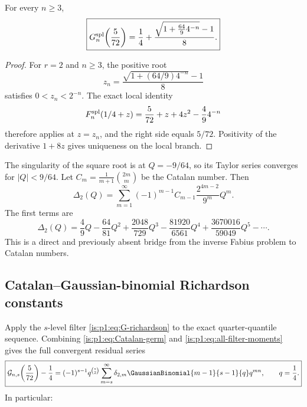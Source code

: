 \begin{theorem}
\label{is:p1:thm:quarter-exact}
For every $n\ge3$,
\begin{equation}
 \boxed{
 G_{n}^{\mathrm{spl}}\!\left(\frac5{72}\right)
 =\frac14+\frac{\sqrt{1+\frac{64}{9}4^{-n}}-1}{8}.}
 \label{is:p1:eq:quarter-exact}
\end{equation}
\end{theorem}

\begin{proof}
For $r=2$ and $n\ge3$, the positive root
\[
 z_n=\frac{\sqrt{1+(64/9)4^{-n}}-1}{8}
\]
satisfies $0<z_n<2^{-n}$.  The exact local identity
\[
 F_{n}^{\mathrm{spl}}(1/4+z)=\frac5{72}+z+4z^2-\frac49 4^{-n}
\]
therefore applies at $z=z_n$, and the right side equals $5/72$.  Positivity of
the derivative $1+8z$ gives uniqueness on the local branch.
\end{proof}

The singularity of the square root is at $Q=-9/64$, so its Taylor series converges
for $|Q|<9/64$.  Let $C_m=\frac1{m+1}\binom{2m}{m}$ be the Catalan number.
Then
\begin{equation}
 \boxed{
 \Delta_2(Q)=\sum_{m=1}^{\infty}
 (-1)^{m-1}C_{m-1}\frac{2^{4m-2}}{9^m}Q^m.}
 \label{is:p1:eq:Catalan-germ}
\end{equation}
The first terms are
\begin{equation}
 \Delta_2(Q)=\frac49Q-\frac{64}{81}Q^2
 +\frac{2048}{729}Q^3-\frac{81920}{6561}Q^4
 +\frac{3670016}{59049}Q^5-\cdots.
 \label{is:p1:eq:Catalan-first}
\end{equation}
This is a direct and previously absent bridge from the inverse Fabius problem to Catalan
numbers.

\subsection{Catalan--Gaussian-binomial Richardson constants}

Apply the $s$-level filter \eqref{is:p1:eq:G-richardson} to the exact quarter-quantile
sequence.  Combining \eqref{is:p1:eq:Catalan-germ} and
\eqref{is:p1:eq:all-filter-moments} gives the full convergent residual series
\begin{equation}
 \boxed{
 \mathcal G_{n,s}\!\left(\frac5{72}\right)-\frac14
 =(-1)^{s-1}q^{\binom s2}
 \sum_{m=s}^{\infty}
 \delta_{2,m}\GaussianBinomial{m-1}{s-1}{q}q^{mn},
 \qquad q=\frac14.}
 \label{is:p1:eq:Catalan-qbinom-full}
\end{equation}
In particular:

